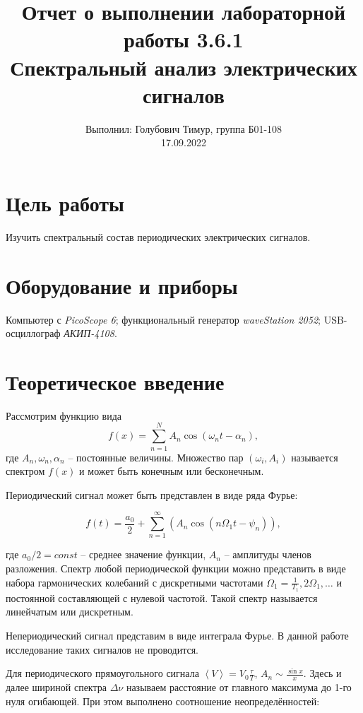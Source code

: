 \documentclass[12pt,a4paper]{article}
\author{\normalsize Выполнил: Голубович Тимур, группа Б01-108 \\
	\normalsize 17.09.2022}
\date{}
\title{
	\large Отчет о выполнении лабораторной работы 3.6.1 \\
	\Large Спектральный анализ электрических сигналов \\ 
	
}
\begin{document}
\maketitle
	
\section*{Цель работы}
Изучить спектральный состав периодических электрических сигналов.

\section*{Оборудование и приборы} 
Компьютер  с \emph{PicoScope 6}; \newline
функциональный генератор \emph{waveStation 2052}; \newline
USB-осциллограф \emph{АКИП-4108}.
	
	
\section*{Теоретическое введение}

Рассмотрим функцию вида 
\begin{equation}\label{f}
	f(x) = \sum_{n=1}^{N}A_n \cos(\omega_n t -\alpha_n),
\end{equation}
где $ A_n, \omega_n, \alpha_n $ -- постоянные величины. Множество пар $ (\omega_i, A_i) $ называется спектром $ f(x) $ и может быть конечным или бесконечным.

Периодический сигнал может быть представлен в виде ряда Фурье:

\begin{equation}\label{key}
	f(t) = \frac{a_0}{2}+\sum_{n=1}^{\infty}(A_n \cos(n \Omega_1 t - \psi_n)),
\end{equation}

где $ a_0/2 = const $ -- среднее значение функции, $ A_n $ -- амплитуды членов разложения. Спектр любой периодической функции можно представить в виде набора гармонических колебаний с дискретными частотами $ \Omega_1 = \frac{1}{T_1}, 2\Omega_1, \ldots $ и постоянной составляющей с нулевой частотой. Такой спектр называется линейчатым или дискретным.

Непериодический сигнал представим в виде интеграла Фурье. В данной работе исследование таких сигналов не проводится.

Для периодического прямоугольного сигнала $ \left< V \right> = V_0 \frac{\tau}{T} $, $ A_n \sim \frac{\sin x}{x} $. Здесь и далее шириной спектра $ \Delta \nu $ называем расстояние от главного максимума до 1-го нуля огибающей. При этом выполнено соотношение неопределённостей:
\end{document}
